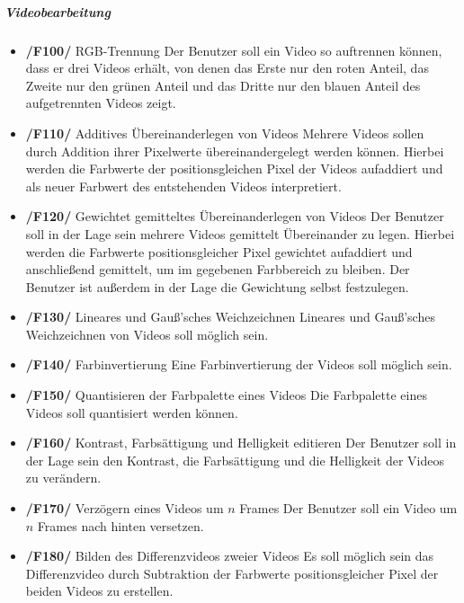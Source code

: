 \subparagraph{Videobearbeitung}
\begin{itemize}
        \item \textbf{/F100/} RGB-Trennung \newline
                 Der Benutzer soll ein Video so auftrennen können, dass er drei Videos erhält, von denen das Erste nur den roten Anteil, das Zweite nur den grünen Anteil und das Dritte nur den blauen Anteil des aufgetrennten Videos zeigt.
        \item \textbf{/F110/} Additives  Übereinanderlegen von Videos \newline
                Mehrere Videos sollen durch Addition ihrer Pixelwerte übereinandergelegt werden können. Hierbei werden die Farbwerte der positionsgleichen Pixel der Videos aufaddiert und als neuer Farbwert des entstehenden Videos interpretiert.
        \item \textbf{/F120/} Gewichtet gemitteltes Übereinanderlegen von  Videos \newline
                Der Benutzer soll in der Lage sein mehrere Videos gemittelt Übereinander zu legen. Hierbei werden die Farbwerte positionsgleicher Pixel gewichtet aufaddiert und anschließend gemittelt, um im gegebenen Farbbereich zu bleiben. Der Benutzer ist außerdem in der Lage die Gewichtung selbst festzulegen.
        \item \textbf{/F130/} Lineares und Gauß'sches Weichzeichnen \newline
                Lineares und Gauß'sches Weichzeichnen von Videos soll möglich sein.
        \item \textbf{/F140/} Farbinvertierung \newline
                Eine Farbinvertierung der Videos soll möglich sein.
        \item \textbf{/F150/} Quantisieren der Farbpalette eines Videos \newline
                Die Farbpalette eines Videos soll quantisiert werden können. %
        \item \textbf{/F160/} Kontrast, Farbsättigung und Helligkeit editieren \newline
                Der Benutzer soll in der Lage sein den Kontrast, die Farbsättigung und die Helligkeit der Videos zu verändern.
        \item \textbf{/F170/} Verzögern eines Videos um $n$ Frames \newline
                Der Benutzer soll ein Video um $n$ Frames nach hinten versetzen.       
        \item \textbf{/F180/} Bilden des Differenzvideos zweier Videos \newline
                Es soll möglich sein das Differenzvideo durch Subtraktion der Farbwerte positionsgleicher Pixel der beiden Videos zu erstellen.
\end{itemize}
 
